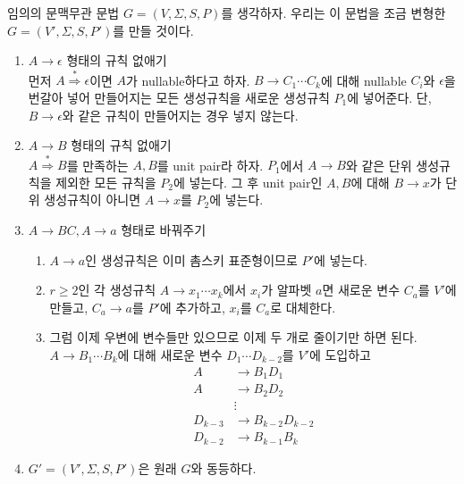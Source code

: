 \documentclass[b5paper]{book}
\theoremstyle{definition}
\newenvironment{pf*}{\pushQED{\qed}\pf}{\popQED\endpf}
\begin{document}
\begin{pf*}
    임의의 문맥무관 문법 $G = (V, \Sigma, S, P)$를 생각하자. 우리는 이 문법을
    조금 변형한 $G = (V', \Sigma, S, P')$를 만들 것이다. 
    \begin{enumerate}
        \item $A \rightarrow \epsilon$ 형태의 규칙 없애기 \\ 
        먼저 $A \overset{*}{\Rightarrow} \epsilon$이면 $A$가 nullable하다고 하자.
        $B \rightarrow C_1 \cdots C_k$에 대해 nullable $C_i$와 $\epsilon$을
        번갈아 넣어 만들어지는 모든 생성규칙을 새로운 생성규칙 $P_1$에 넣어준다. 단, 
        $B \rightarrow \epsilon$와
        같은 규칙이 만들어지는 경우 넣지 않는다. 
        \item $A\rightarrow B$ 형태의 규칙 없애기 \\ 
        $A \overset{*}{\Rightarrow} B$를 만족하는 $A, B$를 unit pair라 하자.
        $P_1$에서 $A \rightarrow B$와 같은 단위 생성규칙을 제외한 모든 규칙을 $P_2$에 넣는다.
        그 후 unit pair인 $A, B$에 대해 $B \rightarrow x$가 단위 생성규칙이 아니면 $A \rightarrow x$를
        $P_2$에 넣는다.
        \item $A \rightarrow BC, A \rightarrow a$ 형태로 바꿔주기
        \begin{enumerate}
            \item $A \rightarrow a$인 생성규칙은 이미 촘스키 표준형이므로 $P'$에 넣는다.
            \item $r \ge 2$인 각 생성규칙 $A \rightarrow x_1 \cdots x_k$에서 $x_i$가 
            알파벳 $a$면
            새로운 변수 $C_a$를 $V'$에 만들고, $C_a \rightarrow a$를 $P'$에 
            추가하고, $x_i$를 $C_a$로 대체한다.
            \item 그럼 이제 우변에 변수들만 있으므로 이제 두 개로 줄이기만 하면 된다.
            $A \rightarrow B_1 \cdots B_k$에 대해 새로운 변수 $D_1 \cdots D_{k-2}$를 $V'$에 도입하고 
            \begin{align*}
                A & \rightarrow B_1 D_1 \\ 
                A & \rightarrow B_2 D_2 \\ 
                &\vdots \\ 
                D_{k-3} &\rightarrow B_{k-2}D_{k-2} \\ 
                D_{k-2} &\rightarrow B_{k-1}B_{k}
            \end{align*}
            
        \end{enumerate}
        \item $G'= (V', \Sigma, S, P' )$은 원래 $G$와 동등하다. 
    \end{enumerate} 
\end{pf*}
\end{document}
